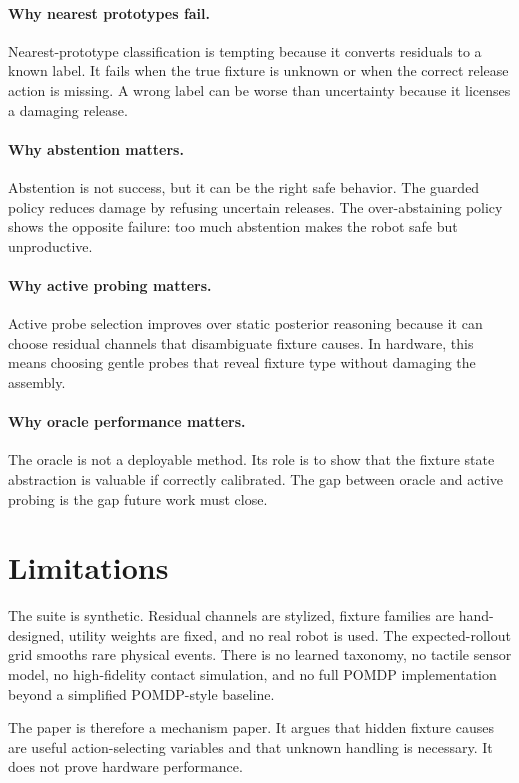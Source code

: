 \documentclass{article}
\begin{document}
\paragraph{Why nearest prototypes fail.}
Nearest-prototype classification is tempting because it converts residuals to
a known label. It fails when the true fixture is unknown or when the correct
release action is missing. A wrong label can be worse than uncertainty because
it licenses a damaging release.

\paragraph{Why abstention matters.}
Abstention is not success, but it can be the right safe behavior. The guarded
policy reduces damage by refusing uncertain releases. The over-abstaining
policy shows the opposite failure: too much abstention makes the robot safe but
unproductive.

\paragraph{Why active probing matters.}
Active probe selection improves over static posterior reasoning because it can
choose residual channels that disambiguate fixture causes. In hardware, this
means choosing gentle probes that reveal fixture type without damaging the
assembly.

\paragraph{Why oracle performance matters.}
The oracle is not a deployable method. Its role is to show that the fixture
state abstraction is valuable if correctly calibrated. The gap between oracle
and active probing is the gap future work must close.

\section{Limitations}

The suite is synthetic. Residual channels are stylized, fixture families are
hand-designed, utility weights are fixed, and no real robot is used. The
expected-rollout grid smooths rare physical events. There is no learned
taxonomy, no tactile sensor model, no high-fidelity contact simulation, and no
full POMDP implementation beyond a simplified POMDP-style baseline.

The paper is therefore a mechanism paper. It argues that hidden fixture causes
are useful action-selecting variables and that unknown handling is necessary.
It does not prove hardware performance.
\end{document}
